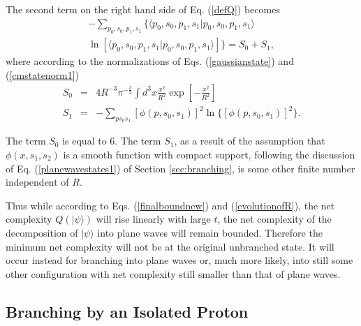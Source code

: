 \documentclass[twocolumn,amsmath,amssymb]{revtex4-1}
\begin{document}
The second term on the right hand side of Eq. (\ref{defQ}) becomes
\begin{multline}
\label{entropy}
-\sum_{p_0, s_0, p_1, s_1} \{  \langle  p_0, s_0, p_1, s_1| p_0, s_0, p_1, s_1 \rangle  \\ \ln [  \langle  p_0, s_0, p_1, s_1| p_0, s_0, p_1,s_1 \rangle ] \} = 
S_0 + S_1,
\end{multline}
where according to the normalizations of Eqs. (\ref{gaussianstate}) and (\ref{cmstatenorm1})
\begin{subequations}
\begin{eqnarray}
\label{s0}
S_0 & = & 4 R^{-3} \pi^{-\frac{3}{2}} \int d^3 x \frac{x^2}{R^2}\exp[ -\frac{x^2}{R^2}] \\
\label{s1}
S_1 & = & -\sum_{p s_0 s_1} [ \phi( p, s_0, s_1)]^2 \ln\{ [ \phi( p, s_0, s_1)]^2 \}.
\end{eqnarray}
\end{subequations}

The term $S_0$ is equal to $6$. The term $S_1$, as a result of the assumption that $\phi( x, s_1, s_2)$ is 
a smooth function with compact support, following the discussion of Eq. (\ref{planewavestates1}) of Section \ref{sec:branching},
is some other finite number independent of $R$.

Thus while according to Eqs. (\ref{finalboundnew}) and (\ref{evolutionofR}), the net complexity $Q( |\psi \rangle )$ 
will rise linearly with large $t$, 
the net complexity of the decomposition of $|\psi \rangle $ into plane waves will remain bounded. Therefore
the minimum net complexity will not be at the original unbranched state. 
It will occur instead for branching into plane waves or, much more likely, into still some other
configuration with net complexity still smaller than that of plane waves.


\subsection{\label{sec:hadronbranching} Branching by an Isolated Proton}
\end{document}
